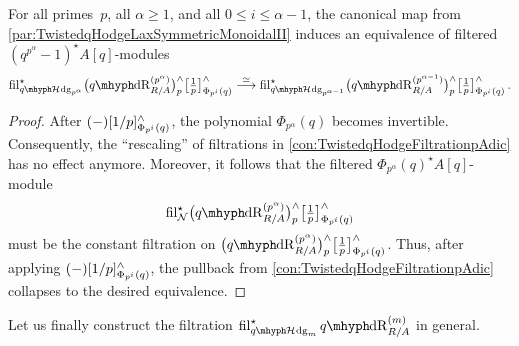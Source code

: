 \documentclass[DIV=12,numbers=enddot,leqno,bibliography=totoc]{scrartcl}
\begin{document}
	\begin{lem}\label{lem:TwistedqHodgepAdicCompatibilityII}
		For all primes~$p$, all $\alpha\geqslant 1$, and all $0\leqslant i\leqslant \alpha-1$, the canonical map from \cref{par:TwistedqHodgeLaxSymmetricMonoidalII} induces an equivalence of filtered $(q^{p^\alpha}-1)^\star A[q]$-modules
		\begin{equation*}
			\fil_{\qHhodge_{p^\alpha}}^\star \bigl(\qdeRham_{R/A}^{(p^\alpha)}\bigr)_p^\complete\bigl[\localise{p}\bigr]_{\Phi_{p^{\smash{i}}}(q)}^\complete\overset{\simeq}{\longrightarrow} \fil_{\qHhodge_{p^{\alpha-1}}}^\star \bigl(\qdeRham_{R/A}^{(p^{\alpha-1})}\bigr)_p^\complete\bigl[\localise{p}\bigr]_{\Phi_{p^{\smash{i}}}(q)}^\complete\,.
		\end{equation*}
	\end{lem}
	\begin{proof}
		After $(-)[1/p]_{\Phi_{p^{\smash{i}}}(q)}^\wedge$, the polynomial $\Phi_{p^\alpha}(q)$ becomes invertible. Consequently, the \enquote{rescaling} of filtrations in \cref{con:TwistedqHodgeFiltrationpAdic} has no effect anymore. Moreover, it follows that the filtered $\Phi_{p^\alpha}(q)^\star A[q]$-module
		\begin{equation*}
			\fil_\Nn^\star \bigl(\qdeRham_{R/A}^{(p^\alpha)}\bigr)_p^\complete\bigl[\localise{p}\bigr]_{\Phi_{p^{\smash{i}}}(q)}^\complete
		\end{equation*}
		must be the constant filtration on $\bigl(\qdeRham_{R/A}^{(p^\alpha)}\bigr)_p^\complete\bigl[\localise{p}\bigr]_{\Phi_{p^{\smash{i}}}(q)}^\complete$. Thus, after applying $(-)[1/p]_{\Phi_{p^{\smash{i}}}(q)}^\wedge$, the pullback from \cref{con:TwistedqHodgeFiltrationpAdic} collapses to the desired equivalence.
	\end{proof}
	Let us finally construct the filtration $ \fil_{\qHhodge_m}^\star \qdeRham_{R/A}^{(m)}$ in general.
\end{document}
